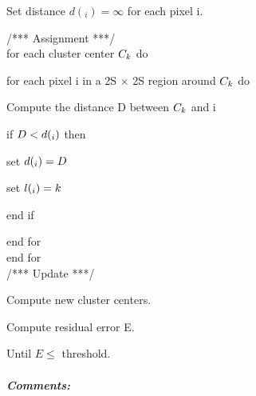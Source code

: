 \documentclass{article}
\begin{document}
{\begin{flushleft}
	Set distance $d(_{i}) = \infty$   for each pixel i.
\end{flushleft}		

/***  Assignment ***/ 	\\

\hspace{4ex}for each cluster center $ {\large }C_{k} $ do

\hspace{6ex}for each pixel i in a 2S $\times$ 2S region around $ {\large}C_{k}$ do

\hspace{8ex}Compute the distance D between $ {\large }C_{k} $ and i

\hspace{8ex}if $ D < {\large }d (_{i})$ then

\hspace{10ex}set ${\large }d (_{i}) = D$

\hspace{10ex}set ${\large}l(_{i}) = k$ 

\hspace{8ex}end if 

\hspace{6ex}end for\\

\hspace{4ex}end for \\		
/*** Update ***/ 

Compute new cluster centers.

Compute residual error E.
\begin{flushleft}
	Until $E \leq$ threshold.
\end{flushleft}	

\subparagraph*{Comments:}
	
}
\end{document}
